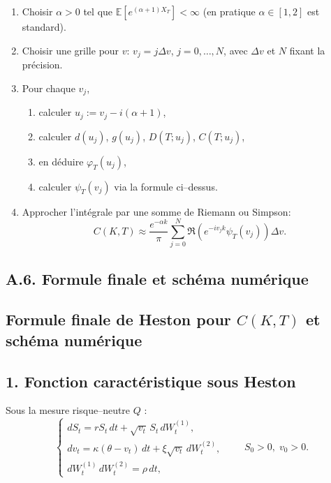 \documentclass[11pt,a4paper]{article}
\newcommand{\1}{\mathbf{1}}
\begin{document}
\begin{enumerate}
\item Choisir $\alpha>0$ tel que
      $\mathbb{E}[e^{(\alpha+1)X_T}]<\infty$ (en pratique $\alpha\in[1,2]$
      est standard).
\item Choisir une grille pour $v$: $v_j = j\Delta v$, $j=0,\dots,N$, avec
      $\Delta v$ et $N$ fixant la pr\'ecision.
\item Pour chaque $v_j$,
      \begin{enumerate}
      \item calculer $u_j := v_j - i(\alpha+1)$,
      \item calculer $d(u_j)$, $g(u_j)$, $D(T;u_j)$, $C(T;u_j)$,
      \item en d\'eduire $\varphi_T(u_j)$,
      \item calculer $\psi_T(v_j)$ via la formule ci--dessus.
      \end{enumerate}
\item Approcher l'int\'egrale par une somme de Riemann ou Simpson:
      \[
      C(K,T) \approx
      \frac{e^{-\alpha k}}{\pi}
      \sum_{j=0}^N
      \Re\!\left( e^{-i v_j k} \psi_T(v_j) \right)\Delta v.
      \]
\end{enumerate}



\subsection*{A.6. Formule finale et sch\'ema num\'erique}


\subsection*{Formule finale de Heston pour $C(K,T)$ et sch\'ema num\'erique}

\subsection*{1. Fonction caract\'eristique sous Heston}

Sous la mesure risque--neutre $Q$ :
\[
\begin{cases}
dS_t = r S_t\,dt + \sqrt{v_t}\,S_t\,dW_t^{(1)}, \\[3pt]
dv_t = \kappa(\theta - v_t)\,dt + \xi\sqrt{v_t}\,dW_t^{(2)}, \\[3pt]
dW_t^{(1)}\,dW_t^{(2)} = \rho\,dt,
\end{cases}
\qquad S_0>0,\; v_0>0.
\]
\end{document}

